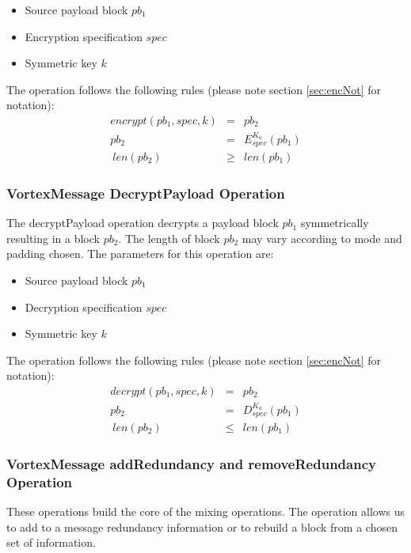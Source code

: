 \begin{itemize}
	\item Source payload block $pb_1$
	\item Encryption specification $spec$
	\item Symmetric key $k$
\end{itemize}

The operation follows the following rules (please note section \ref{sec:encNot} for notation):
\begin{eqnarray}
encrypt(pb_1, spec, k) & = & pb_2 \\
pb_2 & = & E_{spec}^{K_a}\left( pb_1 \right)\\\
len(pb_2) & \geq & len(pb_1)
\end{eqnarray}


\subsubsection{VortexMessage DecryptPayload Operation}
The decryptPayload operation decrypts a payload block $pb_1$ symmetrically resulting in a block $pb_2$. The length of block $pb_2$ may vary according to mode and padding chosen. The parameters for this operation are:

\begin{itemize}
	\item Source payload block $pb_1$
	\item Decryption specification $spec$
	\item Symmetric key $k$
\end{itemize}

The operation follows the following rules (please note section \ref{sec:encNot} for notation):
\begin{eqnarray}
decrypt(pb_1, spec, k) & = & pb_2 \\
pb_2 & = & D_{spec}^{K_a}\left( pb_1 \right)\\\
len(pb_2) & \leq & len(pb_1)
\end{eqnarray}

\subsubsection{VortexMessage addRedundancy and removeRedundancy Operation}
These operations build the core of the mixing operations. The operation allows us to add to a message redundancy information or to rebuild a block from a chosen set of information. 

